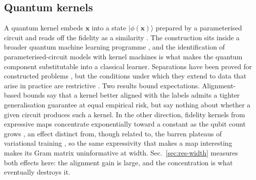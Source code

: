%
%

\subsection{Quantum kernels}
\begin{revbody}

A quantum kernel embeds $\bm{x}$ into a state $|\phi(\bm{x})\rangle$ prepared by
a parameterised circuit and reads off the fidelity as a similarity
\cite{havlicek2019,schuld2019}. The construction sits inside a broader quantum
machine learning programme \cite{ref5,ref6,ref7}, and the identification of
parameterised-circuit models with kernel machines \cite{ref9} is what makes the
quantum component substitutable into a classical learner. Separations have been
proved for constructed problems \cite{ref18}, but the conditions under which they
extend to data that arise in practice are restrictive \cite{ref19,ref20}.
Two results bound expectations. Alignment-based
bounds \cite{cristianini2002,cortes2012} say that a kernel better aligned with
the labels admits a tighter generalisation guarantee at equal empirical risk,
but say nothing about whether a given circuit produces such a kernel. In the
other direction, fidelity kernels from expressive maps concentrate exponentially
toward a constant as the qubit count grows \cite{thanasilp2024}, an effect
distinct from, though related to, the barren plateaus of variational training
\cite{ref10}, so the same expressivity \cite{ref21} that makes a map interesting
makes its Gram matrix uninformative at width. Sec.~\ref{sec:res-width} measures both effects here: the alignment gain
is large, and the concentration is what eventually destroys it.
\end{revbody}

